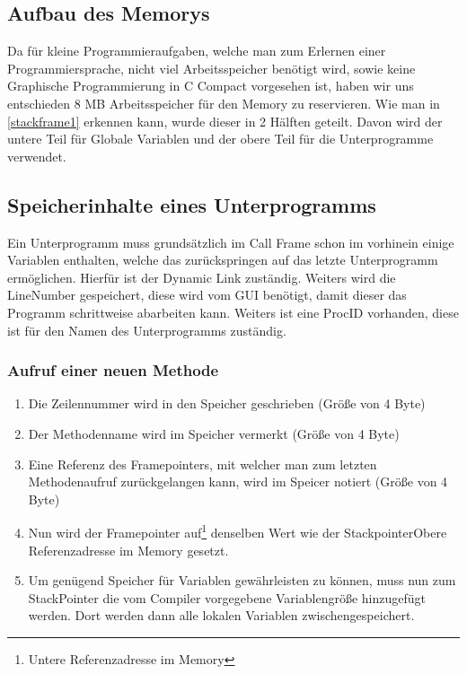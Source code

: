 \subsection{Aufbau des Memorys}
Da für kleine Programmieraufgaben, welche man zum Erlernen einer Programmiersprache, nicht viel Arbeitsspeicher benötigt wird, sowie keine Graphische Programmierung in C Compact vorgesehen ist, haben wir uns entschieden 8 MB Arbeitsspeicher für den Memory zu reservieren.
Wie man in \ref{stackframe1} erkennen kann, wurde dieser in 2 Hälften geteilt. Davon wird der untere Teil für Globale Variablen und der obere Teil für die Unterprogramme verwendet.

\subsection{Speicherinhalte eines Unterprogramms}
Ein Unterprogramm muss grundsätzlich im Call Frame schon im vorhinein einige Variablen enthalten, welche das zurückspringen auf das letzte Unterprogramm ermöglichen. Hierfür ist der Dynamic Link zuständig. Weiters wird die LineNumber gespeichert, diese wird vom GUI benötigt, damit dieser das Programm schrittweise abarbeiten kann. Weiters ist eine ProcID vorhanden, diese ist für den Namen des Unterprogramms zuständig.

\subsubsection{Aufruf einer neuen Methode}
\begin{enumerate}
 \item Die Zeilennummer wird in den Speicher geschrieben (Größe von 4 Byte)
 \item Der Methodenname wird im Speicher vermerkt (Größe von 4 Byte)
 \item Eine Referenz des Framepointers, mit welcher man zum letzten Methodenaufruf zurückgelangen kann, wird im Speicer notiert (Größe von 4 Byte)
 \item Nun wird der Framepointer auf\footnote{Untere Referenzadresse im Memory} denselben Wert wie der Stackpointer{Obere Referenzadresse im Memory} gesetzt.
 \item Um genügend Speicher für Variablen gewährleisten zu können, muss nun zum StackPointer die vom Compiler vorgegebene Variablengröße
 hinzugefügt werden. Dort werden dann alle lokalen Variablen zwischengespeichert.
\end{enumerate}
 
